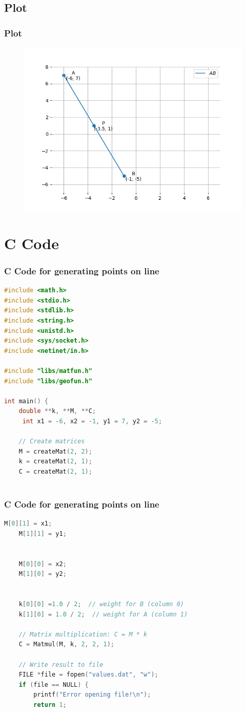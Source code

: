 \documentclass{beamer}
\theoremstyle{remark}
\numberwithin{equation}{section}
\begin{document}
\subsection{Plot}
\begin{frame}[fragile]
\frametitle{Plot}

\begin{figure}[H]
   \centering
   \includegraphics[width=0.8\columnwidth]{figs/fig1.png}
	\caption{}
   \label{stemplot}
\end{figure}
\end{frame}

\section{C Code}
\begin{frame}[fragile]
\frametitle{C Code for generating points on line}
\begin{lstlisting}[language=C]
#include <math.h>
#include <stdio.h>
#include <stdlib.h>
#include <string.h>
#include <unistd.h>
#include <sys/socket.h>
#include <netinet/in.h>

#include "libs/matfun.h"
#include "libs/geofun.h"

int main() {
    double **k, **M, **C;
     int x1 = -6, x2 = -1, y1 = 7, y2 = -5;

    // Create matrices
    M = createMat(2, 2);
    k = createMat(2, 1);
    C = createMat(2, 1);
 
    \end{lstlisting}
\end{frame}
\begin{frame}[fragile]
\frametitle{C Code for generating points on line}
\begin{lstlisting}[language=C]
  M[0][1] = x1;  
    M[1][1] = y1;  


    M[0][0] = x2;  
    M[1][0] = y2;  

 
    k[0][0] =1.0 / 2;  // weight for B (column 0)
    k[1][0] = 1.0 / 2;  // weight for A (column 1)

    // Matrix multiplication: C = M * k
    C = Matmul(M, k, 2, 2, 1);

    // Write result to file
    FILE *file = fopen("values.dat", "w");
    if (file == NULL) {
        printf("Error opening file!\n");
        return 1;
\end{lstlisting}
\end{frame}
\end{document}

